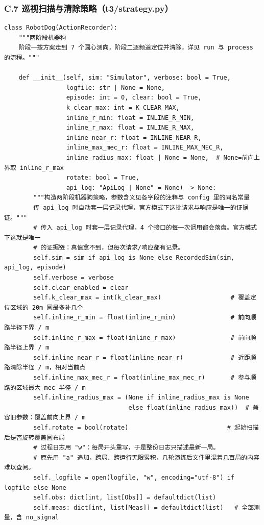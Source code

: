 \documentclass[UTF8, zihao=5,AutoFakeBold=2]{ctexart}
\begin{document}
	\subsubsection*{C.7 \quad 巡视扫描与清除策略（t3/strategy.py）}
	\begin{lstlisting}
class RobotDog(ActionRecorder):
    """两阶段机器狗
    阶段一按方案走到 7 个圆心测向，阶段二逐频道定位并清除，详见 run 与 process 的流程。"""

    def __init__(self, sim: "Simulator", verbose: bool = True,
                 logfile: str | None = None,
                 episode: int = 0, clear: bool = True,
                 k_clear_max: int = K_CLEAR_MAX,
                 inline_r_min: float = INLINE_R_MIN,
                 inline_r_max: float = INLINE_R_MAX,
                 inline_near_r: float = INLINE_NEAR_R,
                 inline_max_mec_r: float = INLINE_MAX_MEC_R,
                 inline_radius_max: float | None = None,  # None=前向上界取 inline_r_max
                 rotate: bool = True,
                 api_log: "ApiLog | None" = None) -> None:
        """构造两阶段机器狗策略，参数含义见各字段的注释与 config 里的同名常量
        传 api_log 时自动套一层记录代理，官方模式下这批请求与响应是唯一的证据链。"""
        # 传入 api_log 时套一层记录代理，4 个接口的每一次调用都会落盘。官方模式下这就是唯一
        # 的证据链：真值拿不到，但每次请求/响应都有记录。
        self.sim = sim if api_log is None else RecordedSim(sim, api_log, episode)
        self.verbose = verbose
        self.clear_enabled = clear
        self.k_clear_max = int(k_clear_max)                   # 覆盖定位区域的 20m 圆最多补几个
        self.inline_r_min = float(inline_r_min)               # 前向顺路半径下界 / m
        self.inline_r_max = float(inline_r_max)               # 前向顺路半径上界 / m
        self.inline_near_r = float(inline_near_r)             # 近距顺路清除半径 / m，相对当前点
        self.inline_max_mec_r = float(inline_max_mec_r)       # 参与顺路的区域最大 mec 半径 / m
        self.inline_radius_max = (None if inline_radius_max is None
                                  else float(inline_radius_max))  # 兼容旧参数：覆盖前向上界 / m
        self.rotate = bool(rotate)                           # 起始扫描后是否旋转覆盖圆布局
        # 过程日志用 "w"：每局开头重写，于是整份日志只描述最新一局。
        # 原先用 "a" 追加，跨局、跨运行无限累积，几轮演练后文件里混着几百局的内容难以查阅。
        self._logfile = open(logfile, "w", encoding="utf-8") if logfile else None
        self.obs: dict[int, list[Obs]] = defaultdict(list)
        self.meas: dict[int, list[Meas]] = defaultdict(list)   # 全部测量，含 no_signal

\end{lstlisting}
\end{document}
